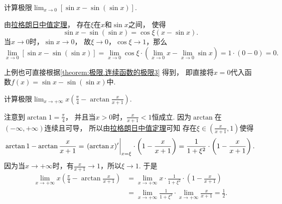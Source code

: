 \begin{example}
计算极限\(\lim_{x\to0} \left[\sin x - \sin(\sin x)\right]\).
\begin{solution}
由\hyperref[theorem:微分中值定理.拉格朗日中值定理]{拉格朗日中值定理}，
存在\(\xi\)在\(x\)和\(\sin x\)之间，
使得\begin{equation*}
	\sin x - \sin(\sin x)
	= \cos\xi (x-\sin x).
\end{equation*}
当\(x\to0\)时，\(\sin x\to0\)，
故\(\xi\to0\)，\(\cos\xi\to1\)，那么\begin{equation*}
	\lim_{x\to0} \left[\sin x - \sin(\sin x)\right]
	= \lim_{x\to0} \cos\xi \cdot
		\left(\lim_{x\to0} x - \lim_{x\to0} \sin x\right)
	= 1 \cdot (0-0) = 0.
\end{equation*}
\end{solution}
\end{example}
\begin{remark}
上例也可直接根据\cref{theorem:极限.连续函数的极限3} 得到，
即直接将\(x=0\)代入函数\(f(x) = \sin x - \sin(\sin x)\)中.
\end{remark}
\begin{example}%
计算极限\(\lim_{x\to+\infty} x \left( \frac\pi4 - \arctan\frac{x}{x+1} \right)\).
\begin{solution}
注意到\(\arctan1 = \frac\pi4\)，
并且当\(x>0\)时，\(\frac{x}{x+1} < 1\)恒成立.
因为\(\arctan\)在\((-\infty,+\infty)\)连续且可导，
所以由\hyperref[theorem:微分中值定理.拉格朗日中值定理]{拉格朗日中值定理}可知
存在\(\xi\in\left( \frac{x}{x+1},1 \right)\)使得\begin{equation*}
	\arctan1 - \arctan\frac{x}{x+1}
	= \eval{(\arctan x)'}_{x=\xi} \cdot \left( 1 - \frac{x}{x+1} \right)
	= \frac1{1+\xi^2} \cdot \left( 1 - \frac{x}{x+1} \right).
\end{equation*}
因为当\(x\to+\infty\)时，有\(\frac{x}{x+1} \to 1\)，所以\(\xi \to 1\).
于是\begin{align*}
	\lim_{x\to+\infty} x \left( \frac\pi4 - \arctan\frac{x}{x+1} \right)
	&= \lim_{x\to+\infty} x
		\cdot \frac1{1+\xi^2}
		\cdot \left( 1 - \frac{x}{x+1} \right) \\
	&= \lim_{x\to+\infty} \frac1{1+\xi^2}
		\cdot \lim_{x\to+\infty} \frac{x}{x+1}
	= \frac12.
\end{align*}
\end{solution}
\end{example}
